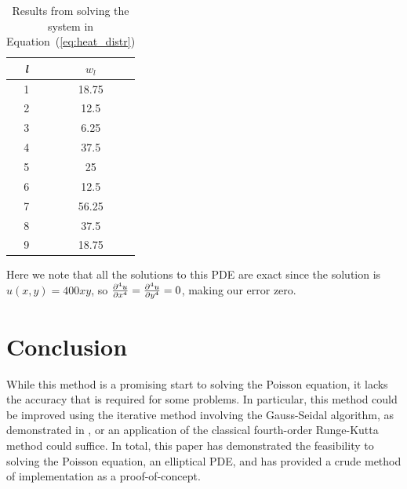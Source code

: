 \documentclass[12pt, titlepage]{article}
\begin{document}
    {\singlespacing
        \begin{table}[H]
            \centering
            \begin{tabular}{|| c | c ||}
                \hline
                \textit{l} & $w_{l}$\\
                \hline
                \hline
                1 & 18.75\\
                2 & 12.5\\
                3 & 6.25\\
                4 & 37.5\\
                5 & 25\\
                6 & 12.5\\
                7 & 56.25\\
                8 & 37.5\\
                9 & 18.75\\
                \hline
                \hline
            \end{tabular}
            \caption{Results from solving the system in Equation~(\ref{eq:heat_distr})}
        \end{table}
    }

    Here we note that all the solutions to this PDE are exact since the solution is $u(x,y)=400xy$, so
    $\pdv[4]{u}{x} = \pdv[4]{u}{y}=0$, making our error zero.
    \section{Conclusion}
    While this method is a promising start to solving the Poisson equation, it lacks the accuracy that is required for
    some problems. In particular, this method could be improved using the iterative method involving the Gauss-Seidal algorithm, as demonstrated in \cite{burden_faires_2011},
    or an application of the classical fourth-order Runge-Kutta method could suffice. In total, this paper has demonstrated
    the feasibility to solving the Poisson equation, an elliptical PDE, and has provided a crude method of implementation as
    a proof-of-concept. 
    \newpage
\end{document}

